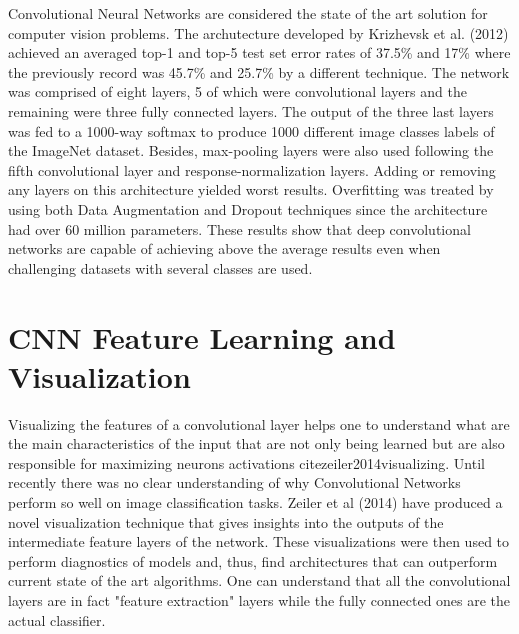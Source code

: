 Convolutional Neural Networks are considered the state of the art solution for computer vision problems. The archutecture developed by Krizhevsk et al. (2012) achieved an averaged top-1 and top-5 test set error rates of 37.5\% and 17\% where the previously record was 45.7\% and 25.7\% by a different technique. The network was comprised of eight layers, 5 of which were convolutional layers and the remaining were three fully connected layers. The output of the three last layers was fed to a 1000-way softmax to produce 1000 different image classes labels of the ImageNet dataset. Besides, max-pooling layers were also used following the fifth convolutional layer and response-normalization layers. Adding or removing any layers on this architecture yielded worst results. Overfitting was treated by using both Data Augmentation and Dropout \cite{hinton2012improving} techniques since the architecture had over 60 million parameters. These results show that deep convolutional networks are capable of achieving above the average results even when challenging datasets with several classes are used.
\section{CNN Feature Learning and Visualization}

Visualizing the features of a convolutional layer helps one to understand what are the main characteristics of the input that are not only being learned but are also responsible for maximizing neurons activations cite{zeiler2014visualizing}. Until recently there was no clear understanding of why Convolutional Networks perform so well on image classification tasks. Zeiler et al (2014) have produced a novel visualization technique that gives insights into the outputs of the intermediate feature layers of the network. These visualizations were then used to perform diagnostics of models and, thus, find architectures that can outperform current state of the art algorithms. One can understand that all the convolutional layers are in fact "feature extraction" layers while the fully connected ones are the actual classifier.

